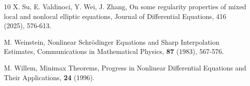 \documentclass[12pt,a4paper,reqno]{amsart}
\numberwithin{equation}{section}
\begin{document}
\begin{thebibliography}{10}
X. Su, E. Valdinoci, Y. Wei, J. Zhang,
On some regularity properties of mixed local and nonlocal elliptic equations,
Journal of Differential Equations, 416 (2025), 576-613.

M. Weinstein,
{Nonlinear Schr\"{o}dinger Equations and Sharp Interpolation Estimates},
Communications in Mathematical
Physics,
\textbf{87} (1983), 567-576.

M. Willem,
{Minimax Theorems},
Progress in Nonlinear Differential Equations and Their Applications,
\textbf{24} (1996).









\end{thebibliography}
\end{document}
